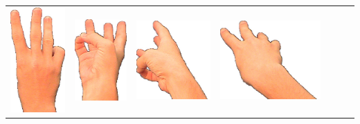 \documentclass{article}
\begin{document}
\begin{center}
\begin{tabular}{r*{6}{c}}
\includegraphics[scale=0.1]{images/06-02-3.jpg}&
\includegraphics[scale=0.1]{images/06-02-4.jpg}&
\includegraphics[scale=0.1]{images/06-02-5.jpg}&
\includegraphics[scale=0.1]{images/06-02-6.jpg}\\

\end{tabular}
\end{center}
\end{document}
